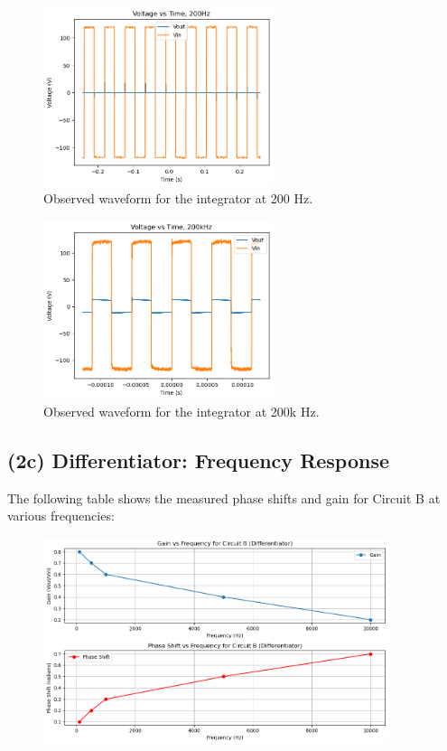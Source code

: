 \documentclass{article}
\begin{document}
\begin{figure}[H]
    \centering
    \includegraphics[width=0.6\textwidth]{./img/Lab2_2b_200.png}  %
    \caption{Observed waveform for the integrator at 200 Hz.}
\end{figure}

\begin{figure}[H]
    \centering
    \includegraphics[width=0.6\textwidth]{./img/Lab2_2b_200k.png}  %
    \caption{Observed waveform for the integrator at 200k Hz.}
\end{figure}


\subsection{(2c) Differentiator: Frequency Response}
The following table shows the measured phase shifts and gain for Circuit B at various frequencies:

\begin{figure}[H]
    \centering
    \includegraphics[width=0.9\textwidth]{./img/Lab2_2c.png}  %
\end{figure}
\end{document}
